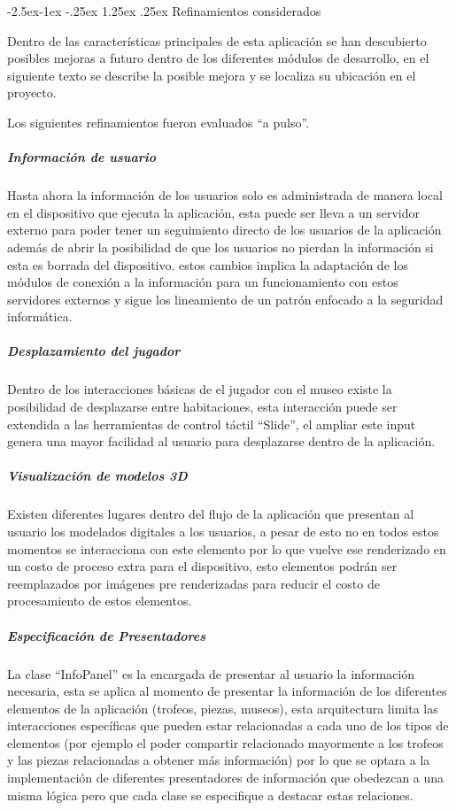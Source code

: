 \documentclass[12pt]{article}
\makeatletter
\renewcommand\paragraph{\@startsection{paragraph}{4}{\z@}%
	{-2.5ex\@plus -1ex \@minus -.25ex}%
	{1.25ex \@plus .25ex}%
	{\normalfont\normalsize\bfseries}}
\makeatother
\begin{document}
\paragraph{Refinamientos considerados}

Dentro de las características principales de esta aplicación se han descubierto posibles mejoras a futuro dentro de los diferentes módulos de desarrollo, en el siguiente  texto se describe la posible mejora y se localiza su ubicación en el proyecto.

Los siguientes refinamientos fueron evaluados “a pulso”.

\subparagraph{\textbf{Información de usuario}}
Hasta ahora la información de los usuarios solo es administrada de manera local en el dispositivo que ejecuta la aplicación, esta puede ser lleva a un servidor externo para poder tener un seguimiento directo de los usuarios de la aplicación además de abrir la posibilidad de que los usuarios no pierdan la información si esta es borrada del dispositivo.
estos cambios implica la adaptación de los módulos de conexión a la información para un funcionamiento con estos servidores externos y sigue los lineamiento de un patrón enfocado a la seguridad informática.

\subparagraph{\textbf{Desplazamiento del jugador}}
Dentro de los interacciones básicas de el jugador con el museo existe la posibilidad de desplazarse entre habitaciones, esta interacción puede ser extendida a las herramientas de control táctil “Slide”, el ampliar este input genera una mayor facilidad al usuario para desplazarse dentro de la aplicación.

\subparagraph{\textbf{Visualización de modelos 3D}}
Existen diferentes lugares dentro del flujo de la aplicación que presentan al usuario los modelados digitales a los usuarios, a pesar de esto no en todos estos momentos se interacciona con este elemento por lo que vuelve ese renderizado en un costo de proceso extra para el dispositivo, esto elementos podrán ser reemplazados por imágenes pre renderizadas para reducir el costo de procesamiento de estos elementos.

\subparagraph{\textbf{Especificación de Presentadores}}
La clase “InfoPanel” es la encargada de presentar  al usuario la información necesaria, esta se aplica al momento de presentar la información de los diferentes elementos de la aplicación (trofeos, piezas, museos), esta arquitectura limita las interacciones específicas que pueden estar relacionadas a cada uno de los tipos de elementos (por ejemplo el poder compartir relacionado mayormente a los trofeos y las piezas relacionadas a obtener más información) por lo que se optara a la implementación de diferentes presentadores de información que obedezcan a una misma lógica pero que cada clase se especifique a destacar estas relaciones.
\end{document}
